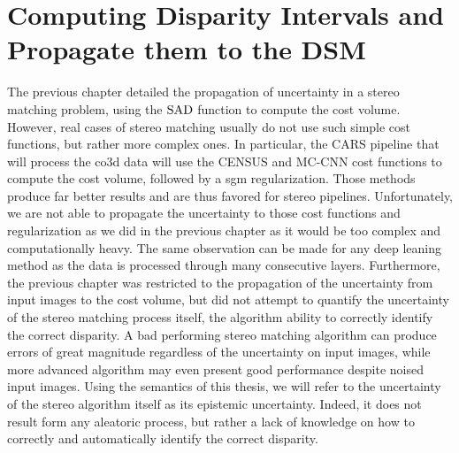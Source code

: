 \chapter{Computing Disparity Intervals and Propagate them to the DSM}\label{chap:epistemic_uncertainty}

The previous chapter detailed the propagation of  uncertainty in a stereo matching problem, using the $\mathrm{SAD}$ function to compute the cost volume. However, real cases of stereo matching usually do not use such simple cost functions, but rather more complex ones. In particular, the CARS pipeline that will process the \acrshort{co3d} data will use the CENSUS and MC-CNN cost functions  \cite{zabih_non-parametric_1994,zbontar_stereo_2016} to compute the cost volume, followed by a \acrshort{sgm} regularization. Those methods produce far better results and are thus favored for stereo pipelines. Unfortunately, we are not able to propagate the uncertainty to those cost functions and regularization as we did in the previous chapter as it would be too complex and computationally heavy. The same observation can be made for any deep leaning method \cite{laga_survey_2022} as the data is processed through many consecutive layers. Furthermore, the previous chapter was restricted to the propagation of the uncertainty from input images to the cost volume, but did not attempt to quantify the uncertainty of the stereo matching process itself, \ie the algorithm ability to correctly identify the correct disparity. A bad performing stereo matching algorithm can produce errors of great magnitude regardless of the uncertainty on input images, while more advanced algorithm may even present good performance despite noised input images. Using the semantics of this thesis, we will refer to the uncertainty of the stereo algorithm itself as its epistemic uncertainty. Indeed, it does not result form any aleatoric process, but rather a lack of knowledge on how to correctly and automatically identify the correct disparity.

